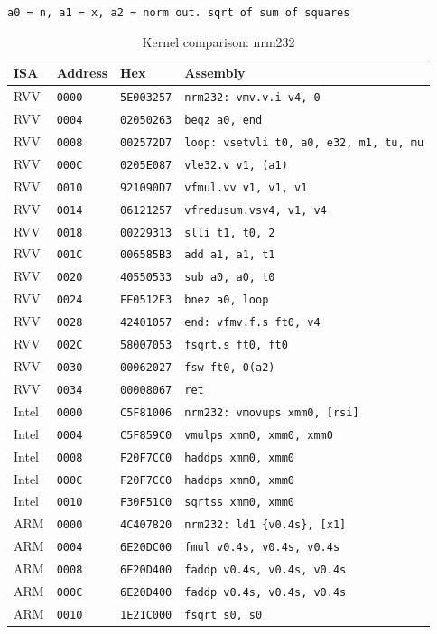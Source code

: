 \begin{table}[htbp]
\centering
\caption{Kernel comparison: nrm232}
\begingroup
\scriptsize
\setlength{\tabcolsep}{4pt}
\noindent \texttt{a0 = n, a1 = x, a2 = norm out. sqrt of sum of squares}\par
\vspace{0.6ex}
\begin{tabular}{@{}l|l|l|p{7.2cm}@{}}
\toprule
ISA & Address & Hex & Assembly \\
\midrule
RVV & \texttt{0000} & \texttt{5E003257} & \texttt{nrm232: vmv.v.i v4, 0} \\
RVV & \texttt{0004} & \texttt{02050263} & \texttt{beqz a0, end} \\
RVV & \texttt{0008} & \texttt{002572D7} & \texttt{loop: vsetvli t0, a0, e32, m1, tu, mu} \\
RVV & \texttt{000C} & \texttt{0205E087} & \texttt{vle32.v v1, (a1)} \\
RVV & \texttt{0010} & \texttt{921090D7} & \texttt{vfmul.vv v1, v1, v1} \\
RVV & \texttt{0014} & \texttt{06121257} & \texttt{vfredusum.vsv4, v1, v4} \\
RVV & \texttt{0018} & \texttt{00229313} & \texttt{slli t1, t0, 2} \\
RVV & \texttt{001C} & \texttt{006585B3} & \texttt{add a1, a1, t1} \\
RVV & \texttt{0020} & \texttt{40550533} & \texttt{sub a0, a0, t0} \\
RVV & \texttt{0024} & \texttt{FE0512E3} & \texttt{bnez a0, loop} \\
RVV & \texttt{0028} & \texttt{42401057} & \texttt{end: vfmv.f.s ft0, v4} \\
RVV & \texttt{002C} & \texttt{58007053} & \texttt{fsqrt.s ft0, ft0} \\
RVV & \texttt{0030} & \texttt{00062027} & \texttt{fsw ft0, 0(a2)} \\
RVV & \texttt{0034} & \texttt{00008067} & \texttt{ret} \\
\midrule
Intel & \texttt{0000} & \texttt{C5F81006} & \texttt{nrm232: vmovups xmm0, [rsi]} \\
Intel & \texttt{0004} & \texttt{C5F859C0} & \texttt{vmulps xmm0, xmm0, xmm0} \\
Intel & \texttt{0008} & \texttt{F20F7CC0} & \texttt{haddps xmm0, xmm0} \\
Intel & \texttt{000C} & \texttt{F20F7CC0} & \texttt{haddps xmm0, xmm0} \\
Intel & \texttt{0010} & \texttt{F30F51C0} & \texttt{sqrtss xmm0, xmm0} \\
\midrule
ARM & \texttt{0000} & \texttt{4C407820} & \texttt{nrm232: ld1 \{v0.4s\}, [x1]} \\
ARM & \texttt{0004} & \texttt{6E20DC00} & \texttt{fmul v0.4s, v0.4s, v0.4s} \\
ARM & \texttt{0008} & \texttt{6E20D400} & \texttt{faddp v0.4s, v0.4s, v0.4s} \\
ARM & \texttt{000C} & \texttt{6E20D400} & \texttt{faddp v0.4s, v0.4s, v0.4s} \\
ARM & \texttt{0010} & \texttt{1E21C000} & \texttt{fsqrt s0, s0} \\
\bottomrule
\end{tabular}
\endgroup
\end{table}
\noindent{}\par
